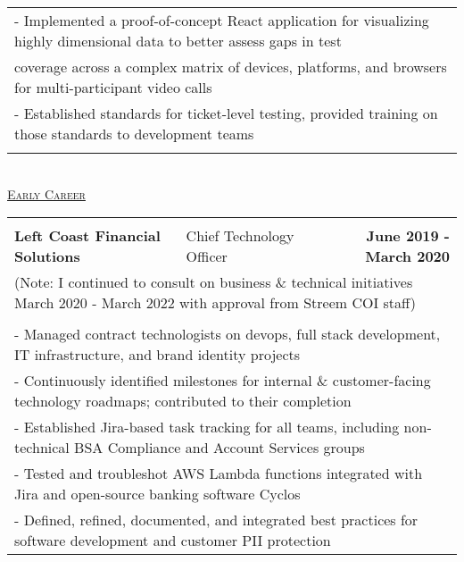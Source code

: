 \documentclass[letterpaper]{article}
\begin{document}
\begin{center}
\begin{tabular}{p{}p{}r}
			\\
			    \multicolumn{3}{p{\textwidth}}{\quad\quad - Implemented a proof-of-concept React application for visualizing highly dimensional data to better assess gaps in test}
			\\
				\multicolumn{3}{p{\textwidth}}{\quad\quad\quad  coverage across a complex matrix of devices, platforms, and browsers for multi-participant video calls }
			\\
				\multicolumn{3}{p{\textwidth}}{\quad\quad - Established standards for ticket-level testing, provided training on those standards to development teams}
			\\
			\\
		\end{tabular} \\
		\vspace{2.25in}
		\underline{\large \scshape Early Career}
		\begin{tabular}{p{}p{}r}
		\\
			\\
				\textbf{Left Coast Financial Solutions} &
				\quad\quad\quad\quad\quad Chief Technology Officer &
				\textbf{June 2019 - March 2020\quad}
			\\
				\multicolumn{3}{p{\textwidth}}{(Note: I continued to consult on business \& technical initiatives March 2020 - March 2022 with approval from Streem COI staff)}
			\\
			\\
				\multicolumn{3}{p{\textwidth}}{\quad\quad - Managed contract technologists on devops, full stack development, IT infrastructure, and brand identity projects} 
			\\
				\multicolumn{3}{p{\textwidth}}{\quad\quad - Continuously identified milestones for internal \& customer-facing technology roadmaps; contributed to their completion}  
			\\
				\multicolumn{3}{p{\textwidth}}{\quad\quad - Established Jira-based task tracking for all teams, including non-technical BSA Compliance and Account Services groups}
			\\
				\multicolumn{3}{p{\textwidth}}{\quad\quad - Tested and troubleshot AWS Lambda functions integrated with Jira and open-source banking software Cyclos} 
			\\
				\multicolumn{3}{p{\textwidth}}{\quad\quad - Defined, refined, documented, and integrated best practices for software development and customer PII protection}
			\\

\end{tabular}
\end{center}
\end{document}
